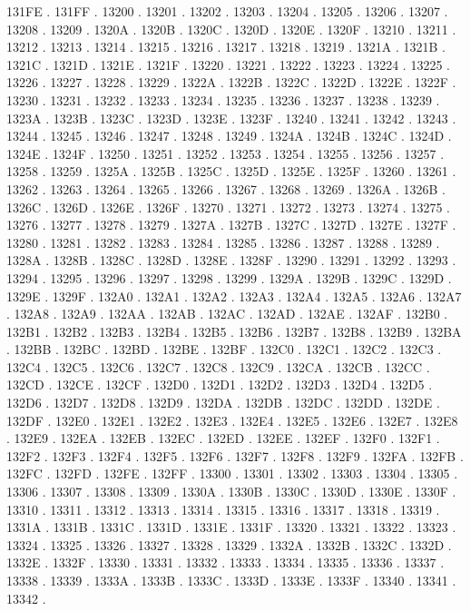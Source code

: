 131FE .
131FF .
13200 .
13201 .
13202 .
13203 .
13204 .
13205 .
13206 .
13207 .
13208 .
13209 .
1320A .
1320B .
1320C .
1320D .
1320E .
1320F .
13210 .
13211 .
13212 .
13213 .
13214 .
13215 .
13216 .
13217 .
13218 .
13219 .
1321A .
1321B .
1321C .
1321D .
1321E .
1321F .
13220 .
13221 .
13222 .
13223 .
13224 .
13225 .
13226 .
13227 .
13228 .
13229 .
1322A .
1322B .
1322C .
1322D .
1322E .
1322F .
13230 .
13231 .
13232 .
13233 .
13234 .
13235 .
13236 .
13237 .
13238 .
13239 .
1323A .
1323B .
1323C .
1323D .
1323E .
1323F .
13240 .
13241 .
13242 .
13243 .
13244 .
13245 .
13246 .
13247 .
13248 .
13249 .
1324A .
1324B .
1324C .
1324D .
1324E .
1324F .
13250 .
13251 .
13252 .
13253 .
13254 .
13255 .
13256 .
13257 .
13258 .
13259 .
1325A .
1325B .
1325C .
1325D .
1325E .
1325F .
13260 .
13261 .
13262 .
13263 .
13264 .
13265 .
13266 .
13267 .
13268 .
13269 .
1326A .
1326B .
1326C .
1326D .
1326E .
1326F .
13270 .
13271 .
13272 .
13273 .
13274 .
13275 .
13276 .
13277 .
13278 .
13279 .
1327A .
1327B .
1327C .
1327D .
1327E .
1327F .
13280 .
13281 .
13282 .
13283 .
13284 .
13285 .
13286 .
13287 .
13288 .
13289 .
1328A .
1328B .
1328C .
1328D .
1328E .
1328F .
13290 .
13291 .
13292 .
13293 .
13294 .
13295 .
13296 .
13297 .
13298 .
13299 .
1329A .
1329B .
1329C .
1329D .
1329E .
1329F .
132A0 .
132A1 .
132A2 .
132A3 .
132A4 .
132A5 .
132A6 .
132A7 .
132A8 .
132A9 .
132AA .
132AB .
132AC .
132AD .
132AE .
132AF .
132B0 .
132B1 .
132B2 .
132B3 .
132B4 .
132B5 .
132B6 .
132B7 .
132B8 .
132B9 .
132BA .
132BB .
132BC .
132BD .
132BE .
132BF .
132C0 .
132C1 .
132C2 .
132C3 .
132C4 .
132C5 .
132C6 .
132C7 .
132C8 .
132C9 .
132CA .
132CB .
132CC .
132CD .
132CE .
132CF .
132D0 .
132D1 .
132D2 .
132D3 .
132D4 .
132D5 .
132D6 .
132D7 .
132D8 .
132D9 .
132DA .
132DB .
132DC .
132DD .
132DE .
132DF .
132E0 .
132E1 .
132E2 .
132E3 .
132E4 .
132E5 .
132E6 .
132E7 .
132E8 .
132E9 .
132EA .
132EB .
132EC .
132ED .
132EE .
132EF .
132F0 .
132F1 .
132F2 .
132F3 .
132F4 .
132F5 .
132F6 .
132F7 .
132F8 .
132F9 .
132FA .
132FB .
132FC .
132FD .
132FE .
132FF .
13300 .
13301 .
13302 .
13303 .
13304 .
13305 .
13306 .
13307 .
13308 .
13309 .
1330A .
1330B .
1330C .
1330D .
1330E .
1330F .
13310 .
13311 .
13312 .
13313 .
13314 .
13315 .
13316 .
13317 .
13318 .
13319 .
1331A .
1331B .
1331C .
1331D .
1331E .
1331F .
13320 .
13321 .
13322 .
13323 .
13324 .
13325 .
13326 .
13327 .
13328 .
13329 .
1332A .
1332B .
1332C .
1332D .
1332E .
1332F .
13330 .
13331 .
13332 .
13333 .
13334 .
13335 .
13336 .
13337 .
13338 .
13339 .
1333A .
1333B .
1333C .
1333D .
1333E .
1333F .
13340 .
13341 .
13342 .
